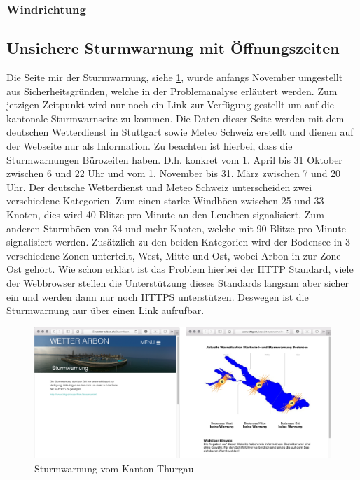 \subsubsection*{Windrichtung}




\subsection{Unsichere Sturmwarnung mit Öffnungszeiten}
Die Seite mir der Sturmwarnung, siehe \ref{img:sturm}, wurde anfangs November umgestellt aus Sicherheitsgründen, welche in der Problemanalyse erläutert werden. Zum jetzigen Zeitpunkt wird nur noch ein Link zur Verfügung gestellt um auf die kantonale Sturmwarnseite zu kommen. Die Daten dieser Seite werden mit dem deutschen Wetterdienst in Stuttgart sowie Meteo Schweiz erstellt und dienen auf der Webseite nur als Information. Zu beachten ist hierbei, dass die Sturmwarnungen Bürozeiten haben. D.h. konkret vom 1. April bis 31 Oktober zwischen 6 und 22 Uhr und vom 1. November bis 31. März zwischen 7 und 20 Uhr. Der deutsche Wetterdienst und Meteo Schweiz unterscheiden zwei verschiedene Kategorien. Zum einen starke Windböen zwischen 25 und 33 Knoten, dies wird 40 Blitze pro Minute an den Leuchten signalisiert. Zum anderen Sturmböen von 34 und mehr Knoten, welche mit 90 Blitze pro Minute signalisiert werden. Zusätzlich zu den beiden Kategorien wird der Bodensee in 3 verschiedene Zonen unterteilt, West, Mitte und Ost, wobei Arbon in zur Zone Ost gehört. Wie schon erklärt ist das Problem hierbei der HTTP Standard, viele der Webbrowser stellen die Unterstützung dieses Standards langsam aber sicher ein und werden dann nur noch HTTPS unterstützen\cite{Mozilla:DeprecatingNon-SecureHTTP}. Deswegen ist die Sturmwarnung nur über einen Link aufrufbar. 


\begin{figure}[h!]
	\centering
	\includegraphics[width=1\linewidth]{img/sturm}
	\caption{Sturmwarnung vom Kanton Thurgau}
	\label{img:sturm}
\end{figure}

